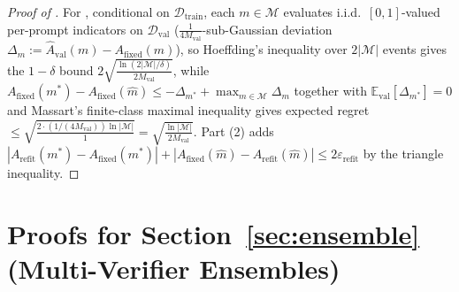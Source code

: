 \documentclass[10pt]{article}
\theoremstyle{plain}
\theoremstyle{definition}
\theoremstyle{remark}
\newcommand{\E}{\mathbb{E}}
\begin{document}
\begin{proof}[Proof of ]
For , conditional on $\mathcal{D}_{\mathrm{train}}$, each $m \in \mathcal{M}$ evaluates i.i.d.\ $[0,1]$-valued per-prompt indicators on $\mathcal{D}_{\mathrm{val}}$ ($\frac{1}{4M_{\mathrm{val}}}$-sub-Gaussian deviation $\Delta_m := \hat{A}_{\mathrm{val}}(m) - A_{\mathrm{fixed}}(m)$), so Hoeffding's inequality over $2|\mathcal{M}|$ events gives the $1-\delta$ bound $2\sqrt{\frac{\ln(2|\mathcal{M}|/\delta)}{2 M_{\mathrm{val}}}}$, while $A_{\mathrm{fixed}}(m^*) - A_{\mathrm{fixed}}(\hat{m}) \le -\Delta_{m^*} + \max_{m\in\mathcal{M}}\Delta_m$ together with $\E_{\mathrm{val}}[\Delta_{m^*}]=0$ and Massart's finite-class maximal inequality gives expected regret $\le \sqrt{\frac{2\cdot (1/(4 M_{\mathrm{val}}))\ln|\mathcal{M}|}{1}} = \sqrt{\frac{\ln|\mathcal{M}|}{2 M_{\mathrm{val}}}}$. Part (2) adds $|A_{\mathrm{refit}}(m^*) - A_{\mathrm{fixed}}(m^*)| + |A_{\mathrm{fixed}}(\hat{m}) - A_{\mathrm{refit}}(\hat{m})| \le 2\varepsilon_{\mathrm{refit}}$ by the triangle inequality.
\end{proof}

\section{Proofs for Section~\texorpdfstring{\ref{sec:ensemble}}{6} (Multi-Verifier Ensembles)}
\label{app:ensemble}
\end{document}
